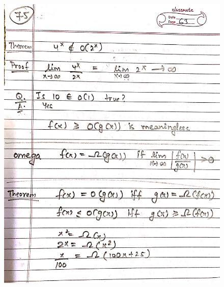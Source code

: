 \begin{figure}[H]
    \centering
    \includegraphics[width=16cm, height=21cm]{"./MIT-6.042J/MIT-6042J-075"}
\end{figure}
\newpage
